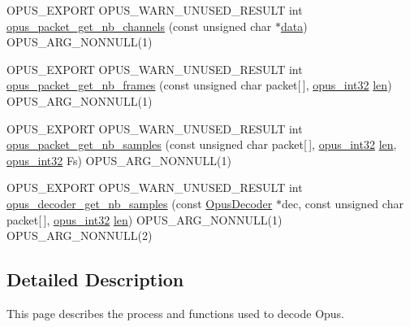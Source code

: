 \begin{DoxyCompactItemize}
O\+P\+U\+S\+\_\+\+E\+X\+P\+O\+RT O\+P\+U\+S\+\_\+\+W\+A\+R\+N\+\_\+\+U\+N\+U\+S\+E\+D\+\_\+\+R\+E\+S\+U\+LT int \mbox{\hyperlink{group__opus__decoder_gae272ae9645edae1a6da1d1337709fa3b}{opus\+\_\+packet\+\_\+get\+\_\+nb\+\_\+channels}} (const unsigned char $\ast$\mbox{\hyperlink{_s_d_l__opengl_8h_a2e335d56e2846b0fea47eed068b2d34a}{data}}) O\+P\+U\+S\+\_\+\+A\+R\+G\+\_\+\+N\+O\+N\+N\+U\+LL(1)
\item 
O\+P\+U\+S\+\_\+\+E\+X\+P\+O\+RT O\+P\+U\+S\+\_\+\+W\+A\+R\+N\+\_\+\+U\+N\+U\+S\+E\+D\+\_\+\+R\+E\+S\+U\+LT int \mbox{\hyperlink{group__opus__decoder_ga932edb5fbae85cf452650ef390f52849}{opus\+\_\+packet\+\_\+get\+\_\+nb\+\_\+frames}} (const unsigned char packet\mbox{[}$\,$\mbox{]}, \mbox{\hyperlink{opus__types_8h_aa4d309d6f80b99dbabebc8f98879ab9a}{opus\+\_\+int32}} \mbox{\hyperlink{_s_d_l__opengl__glext_8h_a652168017ea9a8bbcead03d5c16269fb}{len}}) O\+P\+U\+S\+\_\+\+A\+R\+G\+\_\+\+N\+O\+N\+N\+U\+LL(1)
\item 
O\+P\+U\+S\+\_\+\+E\+X\+P\+O\+RT O\+P\+U\+S\+\_\+\+W\+A\+R\+N\+\_\+\+U\+N\+U\+S\+E\+D\+\_\+\+R\+E\+S\+U\+LT int \mbox{\hyperlink{group__opus__decoder_gacfb7a57368d5453a8a9c03460d9789b5}{opus\+\_\+packet\+\_\+get\+\_\+nb\+\_\+samples}} (const unsigned char packet\mbox{[}$\,$\mbox{]}, \mbox{\hyperlink{opus__types_8h_aa4d309d6f80b99dbabebc8f98879ab9a}{opus\+\_\+int32}} \mbox{\hyperlink{_s_d_l__opengl__glext_8h_a652168017ea9a8bbcead03d5c16269fb}{len}}, \mbox{\hyperlink{opus__types_8h_aa4d309d6f80b99dbabebc8f98879ab9a}{opus\+\_\+int32}} Fs) O\+P\+U\+S\+\_\+\+A\+R\+G\+\_\+\+N\+O\+N\+N\+U\+LL(1)
\item 
O\+P\+U\+S\+\_\+\+E\+X\+P\+O\+RT O\+P\+U\+S\+\_\+\+W\+A\+R\+N\+\_\+\+U\+N\+U\+S\+E\+D\+\_\+\+R\+E\+S\+U\+LT int \mbox{\hyperlink{group__opus__decoder_ga34c90825f85af209160d459bafaa21c5}{opus\+\_\+decoder\+\_\+get\+\_\+nb\+\_\+samples}} (const \mbox{\hyperlink{group__opus__decoder_ga401d8579958d36094715a6b90cd159a6}{Opus\+Decoder}} $\ast$dec, const unsigned char packet\mbox{[}$\,$\mbox{]}, \mbox{\hyperlink{opus__types_8h_aa4d309d6f80b99dbabebc8f98879ab9a}{opus\+\_\+int32}} \mbox{\hyperlink{_s_d_l__opengl__glext_8h_a652168017ea9a8bbcead03d5c16269fb}{len}}) O\+P\+U\+S\+\_\+\+A\+R\+G\+\_\+\+N\+O\+N\+N\+U\+LL(1) O\+P\+U\+S\+\_\+\+A\+R\+G\+\_\+\+N\+O\+N\+N\+U\+LL(2)
\end{DoxyCompactItemize}


\subsection{Detailed Description}
This page describes the process and functions used to decode Opus. 

